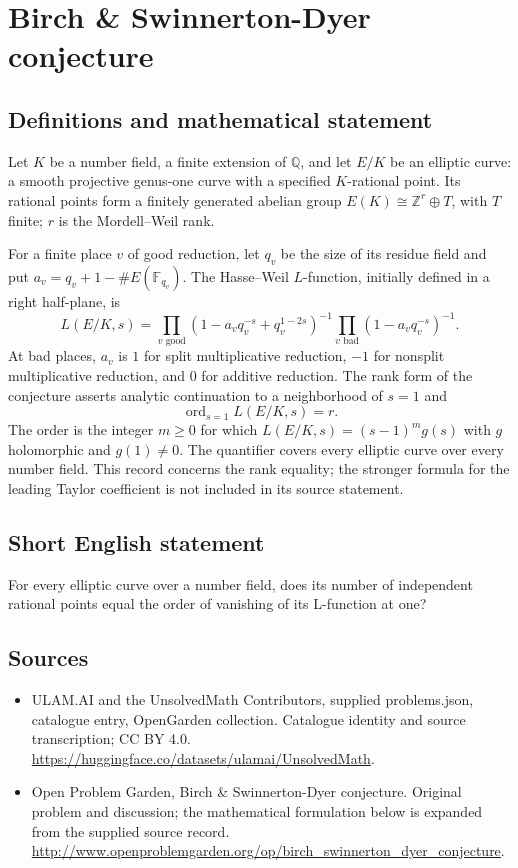 \documentclass[11pt,a4paper]{article}
\begin{document}
\section*{Birch \& Swinnerton-Dyer conjecture}\label{statement}

\subsection{Definitions and mathematical statement}
Let $K$ be a number field, a finite extension of $\mathbb Q$, and let
$E/K$ be an elliptic curve: a smooth projective genus-one curve with
a specified $K$-rational point. Its rational points form a finitely
generated abelian group $E(K)\cong\mathbb Z^r\oplus T$, with $T$
finite; $r$ is the Mordell--Weil rank.

For a finite place $v$ of good reduction, let $q_v$ be the size of
its residue field and put $a_v=q_v+1-\#E(\mathbb F_{q_v})$. The
Hasse--Weil $L$-function, initially defined in a right half-plane, is
\[
 L(E/K,s)=\prod_{v\text{ good}}
 (1-a_vq_v^{-s}+q_v^{1-2s})^{-1}
 \prod_{v\text{ bad}}(1-a_vq_v^{-s})^{-1}.
\]
At bad places, $a_v$ is $1$ for split multiplicative reduction, $-1$
for nonsplit multiplicative reduction, and $0$ for additive reduction.
The rank form of the conjecture asserts analytic continuation to a
neighborhood of $s=1$ and
\[
                    \operatorname{ord}_{s=1}L(E/K,s)=r.
\]
The order is the integer $m\ge0$ for which
$L(E/K,s)=(s-1)^m g(s)$ with $g$ holomorphic and $g(1)\ne0$.
The quantifier covers every elliptic curve over every number field.
This record concerns the rank equality; the stronger formula for the
leading Taylor coefficient is not included in its source statement.
\subsection{Short English statement}
For every elliptic curve over a number field, does its number of independent rational points equal the order of vanishing of its L-function at one?
\subsection{Sources}
\begin{itemize}
\item[S1] ULAM.AI and the UnsolvedMath Contributors, supplied problems.json, catalogue entry, OpenGarden collection. Catalogue identity and source transcription; CC BY 4.0.
\url{https://huggingface.co/datasets/ulamai/UnsolvedMath}.
\item[S2] Open Problem Garden, Birch \& Swinnerton-Dyer conjecture. Original problem and discussion; the mathematical formulation below is expanded from the supplied source record.
\url{http://www.openproblemgarden.org/op/birch_swinnerton_dyer_conjecture}.
\end{itemize}
\end{document}
